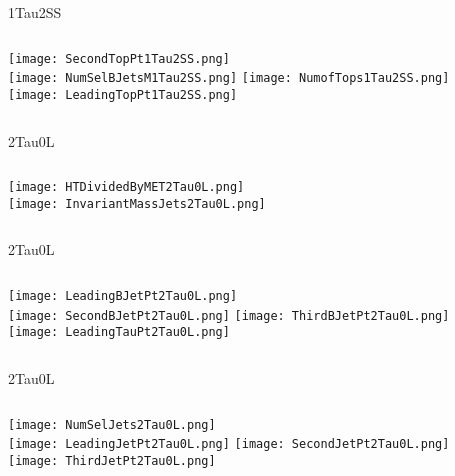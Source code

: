 \documentclass{beamer}
\begin{document}
\begin{frame}{1Tau2SS}
    \begin{columns}[t]
    \centering
    \texttt{[image: SecondTopPt1Tau2SS.png]}\\
    \texttt{[image: NumSelBJetsM1Tau2SS.png]}
    \centering
    \texttt{[image: NumofTops1Tau2SS.png]}\\
    \texttt{[image: LeadingTopPt1Tau2SS.png]}
    \end{columns}
\end{frame}


\begin{frame}{2Tau0L}
    \begin{columns}[t]
    \centering
    \texttt{[image: HTDividedByMET2Tau0L.png]}\\
    \centering
    \texttt{[image: InvariantMassJets2Tau0L.png]}
    \end{columns}
\end{frame}
\begin{frame}{2Tau0L}
    \begin{columns}[t]
    \centering
    \texttt{[image: LeadingBJetPt2Tau0L.png]}\\
    \texttt{[image: SecondBJetPt2Tau0L.png]}
    \centering
    \texttt{[image: ThirdBJetPt2Tau0L.png]}\\
    \texttt{[image: LeadingTauPt2Tau0L.png]}
    \end{columns}
\end{frame}
\begin{frame}{2Tau0L}
    \begin{columns}[t]
    \centering
    \texttt{[image: NumSelJets2Tau0L.png]}\\
    \texttt{[image: LeadingJetPt2Tau0L.png]}
    \centering
    \texttt{[image: SecondJetPt2Tau0L.png]}\\
    \texttt{[image: ThirdJetPt2Tau0L.png]}
    \end{columns}
\end{frame}
\end{document}
